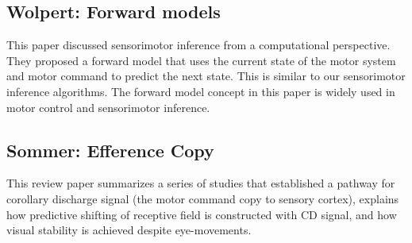 \documentclass{article} %
\begin{document}
\subsection{Wolpert: Forward models}

This paper \cite{Wolpert1996} discussed sensorimotor inference from a
computational perspective. They proposed a forward model that uses the current
state of the motor system and motor command to predict the next state. This is
similar to our sensorimotor inference algorithms. The forward model concept in
this paper is widely used in motor control and sensorimotor inference.

\subsection{Sommer: Efference Copy}

This review paper \cite{Sommer2006} summarizes a series of studies that
established a  pathway for corollary discharge signal (the motor command copy to
sensory cortex), explains how predictive shifting of receptive field is
constructed with CD signal, and how visual stability is achieved despite
eye-movements.



%

\end{document}
